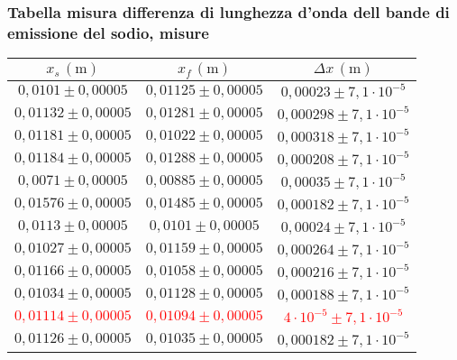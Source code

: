 \subsubsection{Tabella misura differenza di lunghezza d'onda dell bande di emissione del sodio, misure}
    \begin{table}[H]
    \centering
        \begin{tabular}{|c|c|c|}
        \hline
        $ x_s \, (\text{m}) $ & $ x_f \, (\text{m}) $ & $ \Delta x \, (\text{m}) $ \\
        \hline
        $0{,}0101 \pm 0{,}00005$ & $0{,}01125 \pm 0{,}00005$ & $0{,}00023 \pm 7{,}1 \cdot 10^{-5}$ \\
        \hline
        $0{,}01132 \pm 0{,}00005$ & $0{,}01281 \pm 0{,}00005$ & $0{,}000298 \pm 7{,}1 \cdot 10^{-5}$ \\
        \hline
        $0{,}01181 \pm 0{,}00005$ & $0{,}01022 \pm 0{,}00005$ & $0{,}000318 \pm 7{,}1 \cdot 10^{-5}$ \\
        \hline
        $0{,}01184 \pm 0{,}00005$ & $0{,}01288 \pm 0{,}00005$ & $0{,}000208 \pm 7{,}1 \cdot 10^{-5}$ \\
        \hline
        $0{,}0071 \pm 0{,}00005$ & $0{,}00885 \pm 0{,}00005$ & $0{,}00035 \pm 7{,}1 \cdot 10^{-5}$ \\
        \hline
        $0{,}01576 \pm 0{,}00005$ & $0{,}01485 \pm 0{,}00005$ & $0{,}000182 \pm 7{,}1 \cdot 10^{-5}$ \\
        \hline
        $0{,}0113 \pm 0{,}00005$ & $0{,}0101 \pm 0{,}00005$ & $0{,}00024 \pm 7{,}1 \cdot 10^{-5}$ \\
        \hline
        $0{,}01027 \pm 0{,}00005$ & $0{,}01159 \pm 0{,}00005$ & $0{,}000264 \pm 7{,}1 \cdot 10^{-5}$ \\
        \hline
        $0{,}01166 \pm 0{,}00005$ & $0{,}01058 \pm 0{,}00005$ & $0{,}000216 \pm 7{,}1 \cdot 10^{-5}$ \\
        \hline
        $0{,}01034 \pm 0{,}00005$ & $0{,}01128 \pm 0{,}00005$ & $0{,}000188 \pm 7{,}1 \cdot 10^{-5}$ \\
        \hline
        \textcolor{red}{$0{,}01114 \pm 0{,}00005$} & \textcolor{red}{$0{,}01094 \pm 0{,}00005$} & \textcolor{red}{$4 \cdot 10^{-5} \pm 7{,}1 \cdot 10^{-5}$} \\
        \hline
        $0{,}01126 \pm 0{,}00005$ & $0{,}01035 \pm 0{,}00005$ & $0{,}000182 \pm 7{,}1 \cdot 10^{-5}$ \\
        \hline
        \end{tabular}
    \end{table}